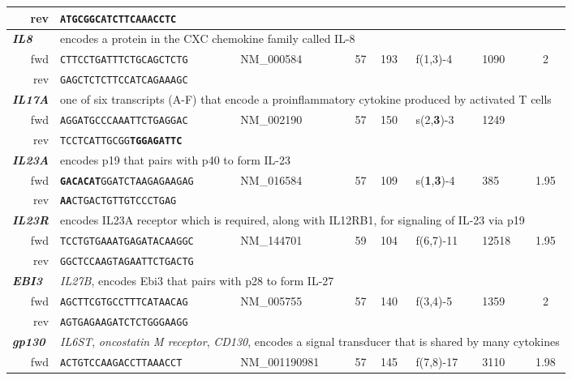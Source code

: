 \documentclass[12pt,a4paper]{scrreprt} %
\begin{document}
\begin{table}[h]
{\begin{tabular}{rllclllc}
\ rev & \texttt{ATGCGGCATCTTCAAAC\textbf{CTC}} & & &  &  &  &  \\ 
\hline \multicolumn{1}{l}{\textit{\textbf{IL8}}} & \multicolumn{7}{l}{encodes a protein in the CXC chemokine family called IL-8} \\ 
\ fwd & \texttt{CTTCCTGATTTCTGCAGCTCTG} & NM\_000584 & 57 & 193 & f(1,3)-4 & 1090 & 2 \\ 
\ rev & \texttt{GAGCTCTCTTCCATCAGAAAGC} &  &  &  &  &  &  \\ 
\hline \multicolumn{1}{l}{\textit{\textbf{IL17A}}} & \multicolumn{7}{l}{one of six transcripts (A-F) that encode a proinflammatory cytokine produced by activated T cells} \\ 
\ fwd & \texttt{AGGATGCCCAAATTCTGAGGAC} & NM\_002190 & 57 & 150 & s(2,\textbf{3})-3 & 1249 &  \\ 
\ rev & \texttt{TCCTCATTGCGG\textbf{TGGAGATTC}} &  &  &  &  &  &  \\ 
\hline \multicolumn{1}{l}{\textit{\textbf{IL23A}}} & \multicolumn{7}{l}{encodes p19    that pairs with p40 to form IL-23} \\ 
\ fwd & \texttt{\textbf{GACACAT}GGATCTAAGAGAAGAG} & NM\_016584 & 57 & 109  & s(\textbf{1},\textbf{3})-4 & 385 & 1.95 \\ 
\ rev & \texttt{\textbf{AA}CTGACTGTTGTCCCTGAG} &  &  &  &  &  &  \\ 
\hline \multicolumn{1}{l}{\textit{\textbf{IL23R}}} & \multicolumn{7}{l}{encodes IL23A receptor which is required, along with IL12RB1, for signaling of IL-23 via p19} \\ 
\ fwd & \texttt{TCCTGTGAAATGAGATACAAGGC} & NM\_144701 & 59 & 104 & f(6,7)-11 & 12518 & 1.95 \\ 
\ rev & \texttt{GGCTCCAAGTAGAATTCTGACTG} &  &  &  &  &  &  \\ 
\hline \multicolumn{1}{l}{\textit{\textbf{EBI3}}} & \multicolumn{7}{l}{\textit{IL27B}, encodes Ebi3 that pairs with p28 to form IL-27} \\ 
\ fwd & \texttt{AGCTTCGTGCCTTTCATAACAG} & NM\_005755 & 57 & 140 & f(3,4)-5 & 1359 & 2 \\ 
\ rev & \texttt{AGTGAGAAGATCTCTGGGAAGG} &  &  &  &  &  &  \\ 
\hline \multicolumn{1}{l}{\textit{\textbf{gp130}}} & \multicolumn{7}{l}{\textit{IL6ST}, \textit{oncostatin M receptor}, \textit{CD130}, encodes a signal transducer that is shared by many cytokines} \\ 
\ fwd & \texttt{ACTGTCCAAGACCTTAAACCT} & NM\_001190981 & 57 & 145 & f(7,8)-17 & 3110 & 1.98 \\ 

\end{tabular}}
\end{table}
\end{document}

